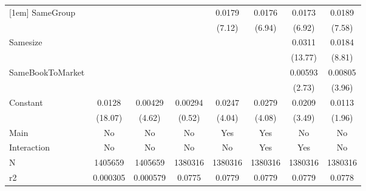 {\begin{tabular}{l*{7}{c}}
[1em]
SameGroup           &                     &                     &                     &      0.0179\sym{***}&      0.0176\sym{***}&      0.0173\sym{***}&      0.0189\sym{***}\\
                    &                     &                     &                     &      (7.12)         &      (6.94)         &      (6.92)         &      (7.58)         \\
[1em]
Samesize            &                     &                     &                     &                     &                     &      0.0311\sym{***}&      0.0184\sym{***}\\
                    &                     &                     &                     &                     &                     &     (13.77)         &      (8.81)         \\
[1em]
SameBookToMarket    &                     &                     &                     &                     &                     &     0.00593\sym{**} &     0.00805\sym{***}\\
                    &                     &                     &                     &                     &                     &      (2.73)         &      (3.96)         \\
[1em]
Constant            &      0.0128\sym{***}&     0.00429\sym{***}&     0.00294         &      0.0247\sym{***}&      0.0279\sym{***}&      0.0209\sym{***}&      0.0113\sym{*}  \\
                    &     (18.07)         &      (4.62)         &      (0.52)         &      (4.04)         &      (4.08)         &      (3.49)         &      (1.96)         \\
\hline
Main                &          No         &          No         &          No         &         Yes         &         Yes         &          No         &          No         \\
Interaction         &          No         &          No         &          No         &          No         &         Yes         &         Yes         &          No         \\
N                   &     1405659         &     1405659         &     1380316         &     1380316         &     1380316         &     1380316         &     1380316         \\
r2                  &    0.000305         &    0.000579         &      0.0775         &      0.0779         &      0.0779         &      0.0779         &      0.0778         \\

\end{tabular}}

